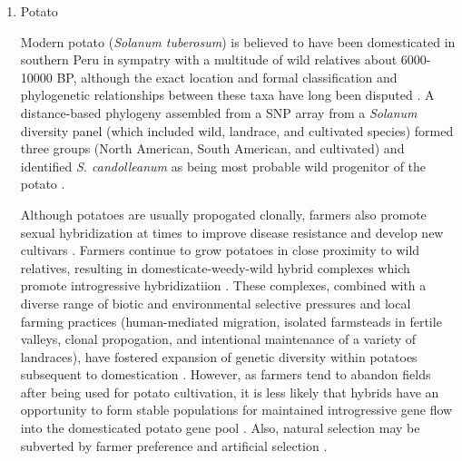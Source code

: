 \documentclass[11pt]{article}
\begin{document}
\begin{enumerate}
\item{Potato}

Modern potato (\emph{Solanum tuberosum}) is believed to have been domesticated in southern Peru in sympatry with a multitude of wild relatives about 6000-10000 BP, although the exact location and formal classification and phylogenetic relationships between these taxa have long been disputed \cite{huaman2002reclassification, spooner2005single, pickersgill1977origins, hawkes1988evolution}.
A distance-based phylogeny assembled from a SNP array from a \emph{Solanum} diversity panel (which included wild, landrace, and cultivated species) formed three groups (North American, South American, and cultivated) and identified \emph{S. candolleanum} as being most probable wild progenitor of the potato \cite{hardigan2015taxonomy}.

Although potatoes are usually propogated clonally, farmers also promote sexual hybridization at times to improve disease resistance and develop new cultivars \cite{quiros1992increase}.
Farmers continue to grow potatoes in close proximity to wild relatives, resulting in domesticate-weedy-wild hybrid complexes which promote introgressive hybridizatiion \cite{rabinowitz1990high, johns1987relationships, linder1987diversity}.
These complexes, combined with a diverse range of biotic and environmental selective pressures and local farming practices (human-mediated migration, isolated farmsteads in fertile valleys, clonal propogation, and intentional maintenance of a variety of landraces), have fostered expansion of genetic diversity within potatoes subsequent to domestication \cite{brush1995potato}.
However, as farmers tend to abandon fields after being used for potato cultivation, it is less likely that hybrids have an opportunity to form stable populations for maintained introgressive gene flow into the domesticated potato gene pool \cite{brush1995potato}.
Also, natural selection may be subverted by farmer preference and artificial selection \cite{brush1981dynamics}.


\end{enumerate}
\end{document}
